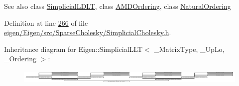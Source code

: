 \begin{DoxySeeAlso}{See also}
class \hyperlink{group___sparse_cholesky___module_class_eigen_1_1_simplicial_l_d_l_t}{Simplicial\+L\+D\+LT}, class \hyperlink{group___ordering_methods___module_class_eigen_1_1_a_m_d_ordering}{A\+M\+D\+Ordering}, class \hyperlink{group___ordering_methods___module_class_eigen_1_1_natural_ordering}{Natural\+Ordering} 
\end{DoxySeeAlso}


Definition at line \hyperlink{eigen_2_eigen_2src_2_sparse_cholesky_2_simplicial_cholesky_8h_source_l00266}{266} of file \hyperlink{eigen_2_eigen_2src_2_sparse_cholesky_2_simplicial_cholesky_8h_source}{eigen/\+Eigen/src/\+Sparse\+Cholesky/\+Simplicial\+Cholesky.\+h}.

Inheritance diagram for Eigen\+:\+:Simplicial\+L\+LT$<$ \+\_\+\+Matrix\+Type, \+\_\+\+Up\+Lo, \+\_\+\+Ordering $>$\+:\begin{figure}[H]
\begin{center}
\leavevmode
\includegraphics[height=0.707071cm]{group___sparse_cholesky___module}
\end{center}
\end{figure}
